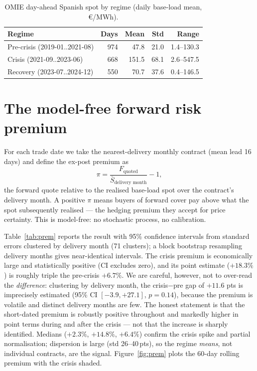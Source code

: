 \documentclass[11pt,a4paper]{article}
\begin{document}
\begin{table}[t]
\centering\small
\caption{OMIE day-ahead Spanish spot by regime (daily base-load mean, \euro/MWh).}
\label{tab:spot}
\begin{tabular}{lrrrr}
\toprule
Regime & Days & Mean & Std & Range \\
\midrule
Pre-crisis (2019-01..2021-08) & 974 & 47.8  & 21.0 & 1.4--130.3 \\
Crisis (2021-09..2023-06)     & 668 & 151.5 & 68.1 & 2.6--547.5 \\
Recovery (2023-07..2024-12)   & 550 & 70.7  & 37.6 & 0.4--146.5 \\
\bottomrule
\end{tabular}
\end{table}

\section{The model-free forward risk premium}

For each trade date we take the nearest-delivery monthly contract (mean lead 16
days) and define the ex-post premium as
\[
\pi = \frac{F_{\text{quoted}}}{\bar S_{\text{delivery month}}} - 1,
\]
the forward quote relative to the realised base-load spot over the contract's
delivery month. A positive $\pi$ means buyers of forward cover pay above what the
spot subsequently realised --- the hedging premium they accept for price
certainty. This is model-free: no stochastic process, no calibration.

Table~\ref{tab:prem} reports the result with 95\% confidence intervals from
standard errors clustered by delivery month (71 clusters); a block bootstrap
resampling delivery months gives near-identical intervals. The crisis premium is
economically large and statistically positive (CI excludes zero), and its point
estimate ($+18.3\%$) is roughly triple the pre-crisis $+6.7\%$. We are careful,
however, not to over-read the \emph{difference}: clustering by delivery month, the
crisis$-$pre gap of $+11.6$ pts is imprecisely estimated (95\% CI $[-3.9,+27.1]$,
$p=0.14$), because the premium is volatile and distinct delivery months are few.
The honest statement is that the short-dated premium is robustly positive
throughout and markedly higher in point terms during and after the crisis --- not
that the increase is sharply identified. Medians ($+2.3\%$, $+14.8\%$, $+6.4\%$)
confirm the crisis spike and partial normalisation; dispersion is large (std
26--40\,pts), so the regime \emph{means}, not individual contracts, are the signal.
Figure~\ref{fig:prem} plots the 60-day rolling premium with the crisis shaded.
\end{document}

